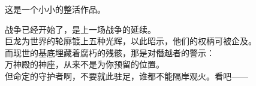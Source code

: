 
\linespread{1.1}

\setmainfont[AutoFakeSlant]{PingFang SC}



\newcommand{\rarityfive}[0]{\normalsize\hspace{1em}{$\bigstar\bigstar\bigstar\bigstar\bigstar$}}
\newcommand{\rarityfour}[0]{\normalsize\hspace{1em}{$\bigstar\bigstar\bigstar\bigstar$}}
\newcommand{\voiceline}[1]{
    \\{\footnotesize\itshape 台词：#1}
}
\newcommand{\charskillprop}[2]{
    \vspace{7pt}%
    \hrule width 0.7\linewidth
    \vspace{7pt}%
    {\normalsize$\blacksquare$ #1}\\%
    \small#2\par
}
\newcommand{\charprofile}[3]{
    \fbox{
        \begin{minipage}{0.7\linewidth}
            \vspace{10pt}%
            {\Large\bfseries#1}\hfill{\small#2}\par
            \vspace{6pt}
            #3\par
            \vspace{10pt}%
        \end{minipage}
    }
}
\newcommand{\tobecontinued}[0]{
    \clearpage\hspace{0.5\linewidth}\vspace{0.42\textheight}\par%
    \begin{minipage}{\linewidth}
        \center%
        以下为草稿
    \end{minipage}
    \clearpage
}






\fulldoctitle

这是一个小小的整活作品。

{\Nmaketoc}\clearpage



战争已经开始了，是上一场战争的延续。\\
巨龙为世界的轮廓镀上五种光辉，以此昭示，他们的权柄可被企及。\\
而现世的基底埋藏着腐朽的残骸，那是对僭越者的警示：\\
万神殿的神座，从来不是为你预留的位置。\\
但命定的守护者啊，不要就此驻足，谁都不能隔岸观火。看吧——

